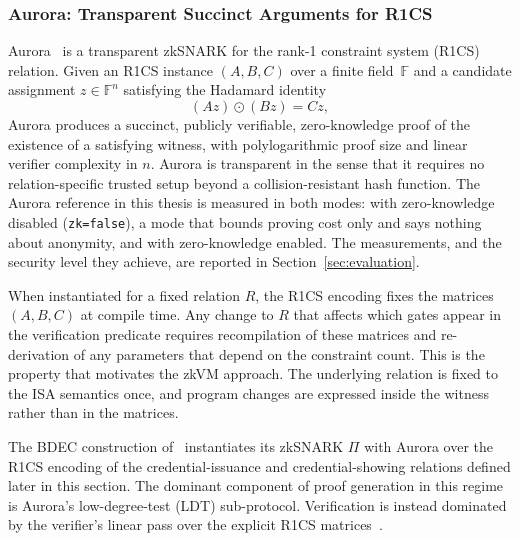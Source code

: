 \subsubsection{Aurora: Transparent Succinct Arguments for R1CS}
Aurora~\cite{cryptoeprint:2018/828} is a transparent zkSNARK for the rank-1 constraint system (R1CS) relation. Given an R1CS instance $(A,B,C)$ over a finite field~$\mathbb{F}$ and a candidate assignment $z\in\mathbb{F}^n$ satisfying the Hadamard identity
\begin{equation*}
  (A z) \odot (B z) = C z,
\end{equation*}
Aurora produces a succinct, publicly verifiable, zero-knowledge proof of the existence of a satisfying witness, with polylogarithmic proof size and linear verifier complexity in $n$. Aurora is transparent in the sense that it requires no relation-specific trusted setup beyond a collision-resistant hash function. The Aurora reference in this thesis is measured in both modes: with zero-knowledge disabled (\texttt{zk=false}), a mode that bounds proving cost only and says nothing about anonymity, and with zero-knowledge enabled. The measurements, and the security level they achieve, are reported in Section~\ref{sec:evaluation}.

When instantiated for a fixed relation $R$, the R1CS encoding fixes the matrices $(A,B,C)$ at compile time. Any change to $R$ that affects which gates appear in the verification predicate requires recompilation of these matrices and re-derivation of any parameters that depend on the constraint count. This is the property that motivates the zkVM approach. The underlying relation is fixed to the ISA semantics once, and program changes are expressed inside the witness rather than in the matrices.

The BDEC construction of~\cite{10.1007/978-981-96-0957-4_3} instantiates its zkSNARK $\Pi$ with Aurora over the R1CS encoding of the credential-issuance and credential-showing relations defined later in this section. The dominant component of proof generation in this regime is Aurora's low-degree-test (LDT) sub-protocol. Verification is instead dominated by the verifier's linear pass over the explicit R1CS matrices~\cite[Thm.~1.2]{cryptoeprint:2018/828}.

